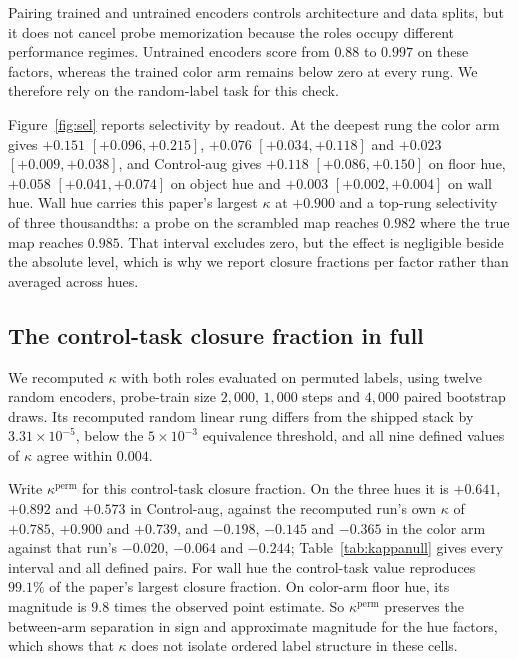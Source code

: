 \documentclass[10pt]{article}
\begin{document}
Pairing trained and untrained encoders controls architecture and data splits, but it does not cancel
probe memorization because the roles occupy different performance regimes. Untrained encoders score from $0.88$ to $0.997$ on these factors, whereas the trained color arm
remains below zero at every rung. We therefore rely on the random-label task for this check.

Figure~\ref{fig:sel} reports selectivity by readout. At the deepest rung the color
arm gives $+0.151$ $[+0.096, +0.215]$, $+0.076$ $[+0.034, +0.118]$ and $+0.023$ $[+0.009, +0.038]$,
and Control-aug gives $+0.118$ $[+0.086, +0.150]$ on floor hue, $+0.058$ $[+0.041, +0.074]$ on
object hue and $+0.003$ $[+0.002, +0.004]$ on wall hue. Wall hue carries this paper's largest
$\kappa$ at $+0.900$ and a top-rung selectivity of three thousandths: a probe on the scrambled map
reaches $0.982$ where the true map reaches $0.985$. That interval excludes zero, but the effect is
negligible beside the absolute level, which is why we report closure fractions per factor rather
than averaged across hues.

\subsection*{The control-task closure fraction in full}
We recomputed $\kappa$ with both roles evaluated on permuted labels, using twelve random encoders,
probe-train size $2{,}000$, $1{,}000$ steps and $4{,}000$ paired
bootstrap draws. Its recomputed random linear rung differs from the shipped stack by
$3.31\times10^{-5}$, below the $5\times10^{-3}$ equivalence threshold, and all nine defined values
of $\kappa$ agree within $0.004$.

Write $\kappa^{\mathrm{perm}}$ for this control-task closure fraction. On the three hues it is
$+0.641$, $+0.892$ and $+0.573$ in Control-aug,
against the recomputed run's own $\kappa$ of $+0.785$, $+0.900$ and $+0.739$, and $-0.198$, $-0.145$
and $-0.365$ in the color arm against that run's $-0.020$, $-0.064$ and $-0.244$;
Table~\ref{tab:kappanull} gives every interval and all defined pairs. For wall
hue the control-task value reproduces $99.1\%$ of the paper's largest closure fraction.
On color-arm floor hue, its magnitude is $9.8$ times the observed point estimate. So
$\kappa^{\mathrm{perm}}$ preserves the between-arm separation in sign and approximate magnitude for
the hue factors, which shows that $\kappa$ does not isolate ordered label structure in these cells.
\end{document}
